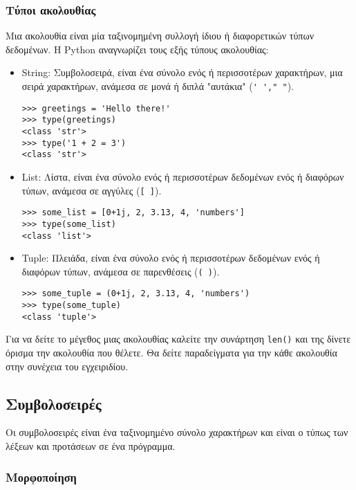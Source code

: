 \documentclass[14pt]{extreport}
\begin{document}
\subsubsection{Τύποι ακολουθίας}

Μια ακολουθία είναι μία ταξινομημένη συλλογή ίδιου ή διαφορετικών τύπων δεδομένων. Η Python αναγνωρίζει τους εξής τύπους ακολουθίας:

\begin{itemize}\itemsep0cm
    \item String: Συμβολοσειρά, είναι ένα σύνολο ενός ή περισσοτέρων χαρακτήρων, μια σειρά χαρακτήρων, ανάμεσα σε μονά ή διπλά "αυτάκια" (\lstinline[language={}]{' '," "}).
          \begin{lstlisting}[numbers=none]
>>> greetings = 'Hello there!'
>>> type(greetings)
<class 'str'>
>>> type('1 + 2 = 3')
<class 'str'>
\end{lstlisting}
    \item List: Λίστα, είναι ένα σύνολο ενός ή περισσοτέρων δεδομένων ενός ή διαφόρων τύπων, ανάμεσα σε αγγύλες (\lstinline[language={}]{[ ]}).
          \begin{lstlisting}[numbers=none]
>>> some_list = [0+1j, 2, 3.13, 4, 'numbers']
>>> type(some_list)
<class 'list'>    
\end{lstlisting}
    \item Tuple: Πλειάδα, είναι ένα σύνολο ενός ή περισσοτέρων δεδομένων ενός ή διαφόρων τύπων, ανάμεσα σε παρενθέσεις (\lstinline[language={}]{( )}).
          \begin{lstlisting}[numbers=none]
>>> some_tuple = (0+1j, 2, 3.13, 4, 'numbers')
>>> type(some_tuple)
<class 'tuple'>    
\end{lstlisting}
\end{itemize}

Για να δείτε το μέγεθος μιας ακολουθίας καλείτε την συνάρτηση \lstinline{len()} και της δίνετε όρισμα την ακολουθία που θέλετε. Θα δείτε παραδείγματα για την κάθε ακολουθία στην συνέχεια του εγχειριδίου.


\newpage

\subsection{Συμβολοσειρές}

Οι συμβολοσειρές είναι ένα ταξινομημένο σύνολο χαρακτήρων και είναι ο τύπως των λέξεων και προτάσεων σε ένα πρόγραμμα.

\subsubsection{Μορφοποίηση}
\end{document}
